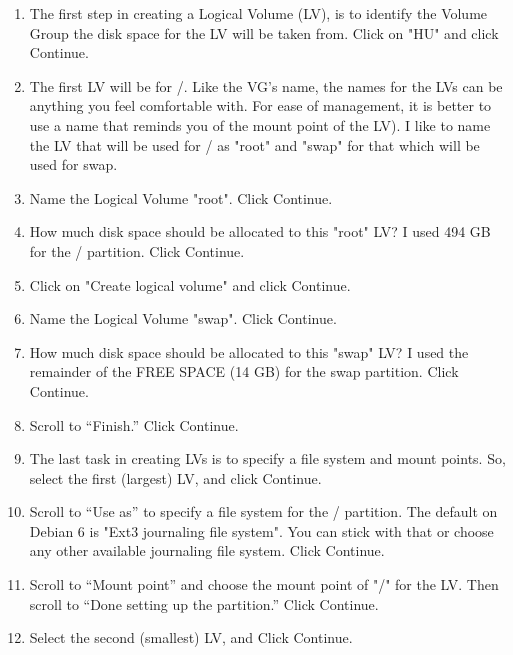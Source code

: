 \documentclass[12pt,notitlepage,onecolumn,oneside,openany]{memoir}
\begin{document}
\begin{enumerate}
\item \textsf{The first step in creating a Logical Volume (LV), is to identify the Volume Group the disk space for the LV will be taken from. Click on "HU" and click Continue.} 

\item \textsf{The first LV will be for /. Like the VG’s name, the names for the LVs can be anything you feel comfortable with. For ease of management, it is better to use a name that reminds you of the mount point of the LV). I like to name the LV that will be used for / as "root" and "swap" for that which will be used for swap.} 

\item \textsf{Name the Logical Volume "root". Click Continue.} 

\item \textsf{How much disk space should be allocated to this "root" LV? I used 494 GB for the / partition. Click Continue.} 

\item \textsf{Click on "Create logical volume" and click Continue.}
 
\item \textsf{Name the Logical Volume "swap". Click Continue.} 

\item \textsf{How much disk space should be allocated to this "swap" LV? I used the remainder of the FREE SPACE (14 GB) for the swap partition. Click Continue.} 

\item \textsf{Scroll to “Finish.” Click Continue.} 

\item \textsf{The last task in creating LVs is to specify a file system and mount points. So, select the first (largest) LV, and click Continue.} 

\item \textsf{Scroll to “Use as” to specify a file system for the / partition. The default on Debian 6 is "Ext3 journaling file system". You can stick with that or choose any other available journaling file system. Click Continue.}
 
\item \textsf{Scroll to “Mount point” and choose the mount point of "/" for the LV. Then scroll to “Done setting up the partition.” Click Continue.} 

\item \textsf{Select the second (smallest) LV, and Click Continue.} 


\end{enumerate}
\end{document}
